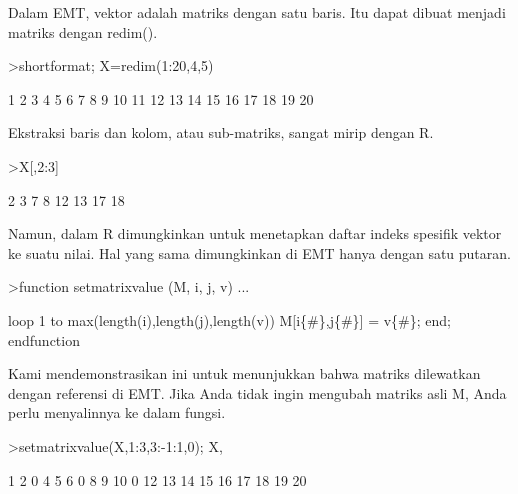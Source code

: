 \documentclass[a4paper,10pt]{article}
\begin{document}
\begin{eulernotebook}
\begin{eulercomment}
\begin{eulercomment}
\begin{eulercomment}
\begin{eulercomment}
\begin{eulercomment}
\begin{eulercomment}
\begin{eulercomment}
\begin{eulercomment}
\begin{eulercomment}
\begin{eulercomment}
\begin{eulercomment}
\begin{eulercomment}
\begin{eulercomment}
\begin{eulercomment}
\begin{eulercomment}
\begin{eulercomment}
\begin{eulercomment}
\begin{eulercomment}
\begin{eulercomment}
Dalam EMT, vektor adalah matriks dengan satu baris. Itu dapat dibuat
menjadi matriks dengan redim().
\end{eulercomment}
\begin{eulerprompt}
>shortformat; X=redim(1:20,4,5)
\end{eulerprompt}
\begin{euleroutput}
          1         2         3         4         5 
          6         7         8         9        10 
         11        12        13        14        15 
         16        17        18        19        20 
\end{euleroutput}
\begin{eulercomment}
Ekstraksi baris dan kolom, atau sub-matriks, sangat mirip dengan R.
\end{eulercomment}
\begin{eulerprompt}
>X[,2:3]
\end{eulerprompt}
\begin{euleroutput}
          2         3 
          7         8 
         12        13 
         17        18 
\end{euleroutput}
\begin{eulercomment}
Namun, dalam R dimungkinkan untuk menetapkan daftar indeks spesifik
vektor ke suatu nilai. Hal yang sama dimungkinkan di EMT hanya dengan
satu putaran.
\end{eulercomment}
\begin{eulerprompt}
>function setmatrixvalue (M, i, j, v) ...
\end{eulerprompt}
\begin{eulerudf}
  loop 1 to max(length(i),length(j),length(v))
     M[i\{#\},j\{#\}] = v\{#\};
  end;
  endfunction
\end{eulerudf}
\begin{eulercomment}
Kami mendemonstrasikan ini untuk menunjukkan bahwa matriks dilewatkan
dengan referensi di EMT. Jika Anda tidak ingin mengubah matriks asli
M, Anda perlu menyalinnya ke dalam fungsi.
\end{eulercomment}
\begin{eulerprompt}
>setmatrixvalue(X,1:3,3:-1:1,0); X,
\end{eulerprompt}
\begin{euleroutput}
          1         2         0         4         5 
          6         0         8         9        10 
          0        12        13        14        15 
         16        17        18        19        20 
\end{euleroutput}

\end{eulercomment}
\end{eulercomment}
\end{eulercomment}
\end{eulercomment}
\end{eulercomment}
\end{eulercomment}
\end{eulercomment}
\end{eulercomment}
\end{eulercomment}
\end{eulercomment}
\end{eulercomment}
\end{eulercomment}
\end{eulercomment}
\end{eulercomment}
\end{eulercomment}
\end{eulercomment}
\end{eulercomment}
\end{eulercomment}
\end{eulernotebook}
\end{document}
